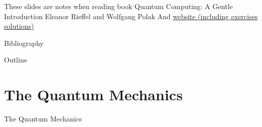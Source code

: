 \documentclass{beamer}
\begin{document}
\def\gtwo#1{\gnqubit{#1}{d}}

\def\gthree#1{\gnqubit{#1}{dd}}


\def\dmeterwide#1#2{*{\xy <0pt,-8pt>;<0pt,8pt> **@{-};
		    <0pt,-8pt>;<#2,-8pt> **@{-} ;
		    <0pt, 8pt>;<#2, 8pt> **@{-} ;
		    <#2,0pt>-<5pt,0pt>*{#1} ;
		    <#2,0pt>*\cir<8pt>{r_l}\endxy}}

\def\dmeter#1{\dmeterwide{#1}{12pt}}



\begin{frame}
  \titlepage
\end{frame}

\begin{frame}
  These slides are notes when reading book
  \newline
  \newline
  \LARGE{\textrm{Quantum Computing: A Gentle Introduction}}\tiny\cite{gentleintroduction}
  \newline
  \newline
  \small{\textrm{Eleanor Rieffel and Wolfgang Polak}}
  \newline
  \newline
  And \href{http://twoqubits.wikidot.com/start}{website (including exercises solutions)}
\end{frame}

\begin{frame}{Bibliography}
  \AtNextBibliography{\tiny}
  \printbibliography
\end{frame}

\begin{frame}[t,allowframebreaks]{Outline}
  \tableofcontents
\end{frame}

\section{The Quantum Mechanics}
\begin{frame}
  The Quantum Mechanics
\end{frame}
\end{document}
